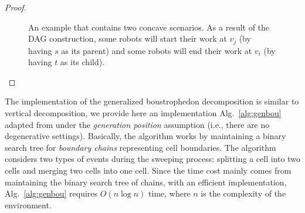 \begin{proof}
\begin{figure} [ht]
    \caption{An example that contains two concave scenarios. As a result of the DAG construction, some robots will
    start their work at $v_j$ (by having $s$ as its parent) and some robots will end their work at $v_i$ (by having $t$ as its child).}
    \label{fig:concave_vertices}
\end{figure}
\end{proof}




The implementation of the generalized boustrophedon decomposition is similar 
to vertical decomposition, we provide here an implementation 
Alg.~\ref{alg:genbou} adapted from \cite{lavalle2006sweepline} under the 
\emph{generation position} assumption (i.e., there are no degenerative 
settings).
%
Basically, the algorithm works by maintaining a binary search tree for 
\emph{boundary chains} representing cell boundaries. The algorithm considers 
two types of events during the sweeping process: splitting a cell into two 
cells and merging two cells into one cell.
%
Since the time cost mainly comes from maintaining the binary search tree of 
chains, with an efficient implementation, Alg.~\ref{alg:genbou} requires 
$O(n \log n)$ time, where $n$ is the complexity of the environment. 


